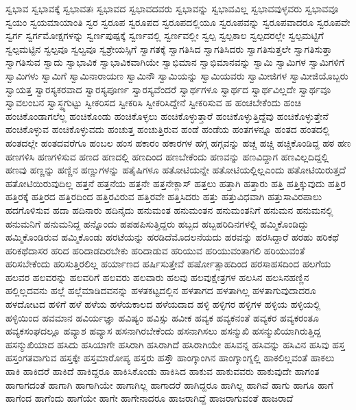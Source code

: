 {ಸ್ವಭಾವ
ಸ್ವಭಾವಕ್ಕೆ
ಸ್ವಭಾವತಃ
ಸ್ವಭಾವದ
ಸ್ವಭಾವದವರು
ಸ್ವಭಾವನ್ನು
ಸ್ವಭಾವವಿಲ್ಲ
ಸ್ವಭಾವವುಳ್ಳವರು
ಸ್ವಭಾವವೂ
ಸ್ವಯಂ
ಸ್ವಯಮಾಯಾಂತಿ
ಸ್ವರ
ಸ್ವರೂಪ
ಸ್ವರೂಪದ
ಸ್ವರೂಪದಲ್ಲಿಯೂ
ಸ್ವರೂಪವನ್ನು
ಸ್ವರೂಪವಾದರೂ
ಸ್ವರೂಪವೇ
ಸ್ವರ್ಗ
ಸ್ವರ್ಗಮೋಕ್ಷಗಳನ್ನು
ಸ್ವರ್ಣಪುಷ್ಪಕ್ಕೆ
ಸ್ವರ್ಣವಲ್ಲಿ
ಸ್ವರ್ಣವಲ್ಲೀ
ಸ್ವಲ್ಪ
ಸ್ವಲ್ಪಕಾಲ
ಸ್ವಲ್ಪದರಲ್ಲೇ
ಸ್ವಲ್ಪಮಟ್ಟಿಗೆ
ಸ್ವಲ್ಪಮಟ್ಟಿನ
ಸ್ವಲ್ಪವೂ
ಸ್ವಲ್ವವೂ
ಸ್ವಶ್ರೇಯಸ್ಸಿಗೆ
ಸ್ವಾಗತಕ್ಕೆ
ಸ್ವಾಗತಿಸಿದ
ಸ್ವಾಗತಿಸಿದರು
ಸ್ವಾಗತಿಸುತ್ತಲೇ
ಸ್ವಾಗತಿಸುತ್ತಾ
ಸ್ವಾಗತಿಸುವ
ಸ್ವಾದು
ಸ್ವಾಭಾವಿಕ
ಸ್ವಾಭಾವಿಕವಾಗಿಯೇ
ಸ್ವಾಭಿಮಾನ
ಸ್ವಾಭಿಮಾನವನ್ನು
ಸ್ವಾಮಿ
ಸ್ವಾಮಿಗಳ
ಸ್ವಾಮಿಗಳಿಗೆ
ಸ್ವಾಮಿಗಳು
ಸ್ವಾಮಿಗೆ
ಸ್ವಾಮಿನಾರಾಯಣ
ಸ್ವಾಮಿನೌ
ಸ್ವಾಮಿಯನ್ನು
ಸ್ವಾಮಿಯವರು
ಸ್ವಾಮೀಜಿಗಳ
ಸ್ವಾಮೀಜಿಯೊಬ್ಬರು
ಸ್ವಾಯತ್ತ
ಸ್ವಾರಸ್ಯಕರವಾದ
ಸ್ವಾರಸ್ಯಪೂರ್ಣ
ಸ್ವಾರಸ್ಯವೆಂದರೆ
ಸ್ವಾರ್ಥಗಳೂ
ಸ್ವಾರ್ಥದ
ಸ್ವಾರ್ಥವಿಲ್ಲದೇ
ಸ್ವಾರ್ಥವೂ
ಸ್ವಾವಲಂಬನ
ಸ್ವಾಸ್ಥ್ಯಗುಟ್ಟು
ಸ್ವೀಕರಿಸದ
ಸ್ವೀಕರಿಸಿ
ಸ್ವೀಕರಿಸಿದ್ದೇನೆ
ಸ್ವೀಕರಿಸುವ
ಹ
ಹಂಚಬೇಕೆಂದು
ಹಂಚಿ
ಹಂಚಿಕೊಂಡಾಗಲೆಲ್ಲ
ಹಂಚಿಕೊಂಡು
ಹಂಚಿಕೊಳ್ಳಲು
ಹಂಚಿಕೊಳ್ಳುತ್ತಾರೆ
ಹಂಚಿಕೊಳ್ಳುತ್ತಿದ್ದೆವು
ಹಂಚಿಕೊಳ್ಳುತ್ತೇನೆ
ಹಂಚಿಕೊಳ್ಳುವ
ಹಂಚಿಕೊಳ್ಳುವದು
ಹಂಚುತ್ತ
ಹಂಚುತ್ತಿರುವ
ಹಂಡೆ
ಹಂಡೆಯ
ಹಂತಗಳನ್ನೂ
ಹಂತದ
ಹಂತದಲ್ಲಿ
ಹಂತದಲ್ಲೇ
ಹಂತದವರೆಗೂ
ಹಂಬಲ
ಹಂಸ
ಹಕಾರಂ
ಹಕಾರಗಳ
ಹಗ್ಗ
ಹಗ್ಗವನ್ನು
ಹಚ್ಚ
ಹಚ್ಚಿ
ಹಚ್ಚಿಕೊಂಡಿದ್ದ
ಹಠ
ಹಣ
ಹಣಗಳಿಸಿ
ಹಣಗಳಿಸುವ
ಹಣದ
ಹಣದಲ್ಲಿ
ಹಣದಿಂದ
ಹಣಬೇಕೆಂದು
ಹಣವನ್ನು
ಹಣವಿದ್ದಾಗ
ಹಣವಿಲ್ಲದಿದ್ದಲ್ಲಿ
ಹಣವು
ಹಣ್ಣನ್ನು
ಹಣ್ಣಿನ
ಹಣ್ಣುಗಳನ್ನು
ಹತೈಷಿಗಳೂ
ಹತೋಟಿಯನ್ನೇ
ಹತೋಟಿಯಲ್ಲಿಲ್ಲಎಂದು
ಹತೋಟಿಯಿರುತ್ತದೆ
ಹತೋಟಿಯಿರುವುದಿಲ್ಲ
ಹತ್ತನೆ
ಹತ್ತನೆಯ
ಹತ್ತನೇ
ಹತ್ತನೇಕ್ಲಾಸ್
ಹತ್ತಲು
ಹತ್ತಾಗಿ
ಹತ್ತಾರು
ಹತ್ತಿ
ಹತ್ತಿಕ್ಕುವುದು
ಹತ್ತಿರ
ಹತ್ತಿರಕ್ಕೆ
ಹತ್ತಿರದ
ಹತ್ತಿರದಿಂದ
ಹತ್ತಿರವಿರುವ
ಹತ್ತಿರವೇ
ಹತ್ತಿಸಿದರು
ಹತ್ತು
ಹತ್ತುವಿಧವಾಗಿ
ಹತ್ತುಸಾವಿರಪಾಲು
ಹದಗೊಳಿಸುವ
ಹದಾ
ಹದಿನಾರು
ಹದಿನೈದು
ಹನುಮಂತ
ಹನುಮಂತನ
ಹನುಮಂತನಿಗೆ
ಹನುಮನ
ಹನುಮನಲ್ಲಿ
ಹನುಮನಿಗೆ
ಹನುಮನಿದ್ದ
ಹನ್ನೊಂದು
ಹಪಹಪಿಸುತ್ತಿದ್ದರು
ಹಬ್ಬದ
ಹಬ್ಬಹರಿದಿನಗಳಲ್ಲಿ
ಹಮ್ಮಿಕೊಂಡಿದ್ದು
ಹಮ್ಮಿಕೊಂಡಿರುವ
ಹಮ್ಮಿಕೊಂಡು
ಹರಟೆಯನ್ನು
ಹರಡಿದೆಮೊದಲನೆಯದು
ಹರವನ್ನು
ಹರಸಿದ್ದಾರೆ
ಹರಹು
ಹರಿಕಥೆ
ಹರಿಕಥೆದಾಸರ
ಹರಿದ
ಹರಿದಾಡದಿರಬೇಕು
ಹರಿದಾಡುವ
ಹರಿಯುವ
ಹರಿಯುವಂತಾಗಲಿ
ಹರಿಯುವಂತೆ
ಹರಿಸಬೇಕೆಂದು
ಹರಿಸುತ್ತಿರಲಿಲ್ಲ
ಹರ್ಯಾಣದ
ಹರ್ಷಿಸುತ್ತೇವೆ
ಹರ್ಷೋತ್ಸಾಹದಿಂದ
ಹರಸಾಹಸದಿಂದ
ಹಲಗೆಯ
ಹಲವರ
ಹಲವರನ್ನು
ಹಲವರಿಗೆ
ಹಲವರು
ಹಲವಾರು
ಹಲವು
ಹಲವುಕ್ಷೇತ್ರಗಳ
ಹಲಸಿನ
ಹಲಸಿನಹಣ್ಣಿನ
ಹಲ್ಲಿಲ್ಲದವನು
ಹಲ್ಲೆ
ಹಲ್ಲೆಮಾಡಿದವನನ್ನು
ಹಳತಕಟ್ಟದಲ್ಲಿನ
ಹಳತಾಗದ
ಹಳತಾಗಿಲ್ಲ
ಹಳತಾಗುವುದಾದರೂ
ಹಳದೋಟದ
ಹಳಿಗೆ
ಹಳೆ
ಹಳೆಯ
ಹಳೆಯಕಾಲದ
ಹಳೆಯದಾದ
ಹಳ್ಳಿ
ಹಳ್ಳಿಗರ
ಹಳ್ಳಿಗಳ
ಹಳ್ಳಿಯ
ಹಳ್ಳಿಯಲ್ಲಿ
ಹಳ್ಳಿಯಿಂದ
ಹವಮಾನ
ಹವಿರ್ಯಜ್ಞಾ
ಹವಿಷ್ಯಂ
ಹವಿಸ್ಸು
ಹವೀಕ
ಹವ್ಯಕ
ಹವ್ಯಕನಂತೆ
ಹವ್ಯಕರ
ಹವ್ಯಕರಂತೂ
ಹವ್ಯಕಸಂಘದಲ್ಲೂ
ಹವ್ಯಾಶ
ಹವ್ಯಾಸ
ಹಸನಾಗಿರಬೇಕೆಂದು
ಹಸನಾಗಿಸಲು
ಹಸನ್ಮುಖಿ
ಹಸನ್ಮುಖಿಯಾಗಿರುತ್ತಿದ್ದ
ಹಸನ್ಮುಖಿಯಾದ
ಹಸಿದು
ಹಸಿಯಾಗೇ
ಹಸಿರಾಗಿ
ಹಸಿರಾಗಿದೆ
ಹಸಿರಾಗಿಯೇ
ಹಸಿವನ್ನ
ಹಸಿವನ್ನು
ಹಸಿವಿನ
ಹಸಿವು
ಹಸ್ತ
ಹಸ್ತಂಗತವಾಗುವ
ಹಸ್ತಕ್ಕೇ
ಹಸ್ತಮಾರೋಪ್ಯ
ಹಸ್ತರು
ಹಸ್ತೌ
ಹಾಂಗ್ಕಾಂಗಿನ
ಹಾಂಗ್ಕಾಂಗ್ನಲ್ಲಿ
ಹಾಕಲಿಲ್ಲವಂತೆ
ಹಾಕಲು
ಹಾಕಿ
ಹಾಕಿದರೆ
ಹಾಕಿದೆ
ಹಾಕಿದ್ದರೂ
ಹಾಕಿಸಿಕೊಂಡು
ಹಾಕಿಸಿದ
ಹಾಕುವ
ಹಾಕುವವರು
ಹಾಕುವುದೇ
ಹಾಗಂತ
ಹಾಗಾಗದಂತೆ
ಹಾಗಾಗಿ
ಹಾಗಾಗಿಯೇ
ಹಾಗಾಗಿಲ್ಲ
ಹಾಗಾದರೆ
ಹಾಗಿದ್ದರೂ
ಹಾಗಿಲ್ಲ
ಹಾಗಿವೆ
ಹಾಗು
ಹಾಗೂ
ಹಾಗೆ
ಹಾಗೆಂದ
ಹಾಗೆಂದು
ಹಾಗೆಯೇ
ಹಾಗೇ
ಹಾಗೇನಾದರೂ
ಹಾಜರಾಗಿದ್ದೆ
ಹಾಜರಾಗುವಂತೆ
ಹಾಜರಾದೆ
}
